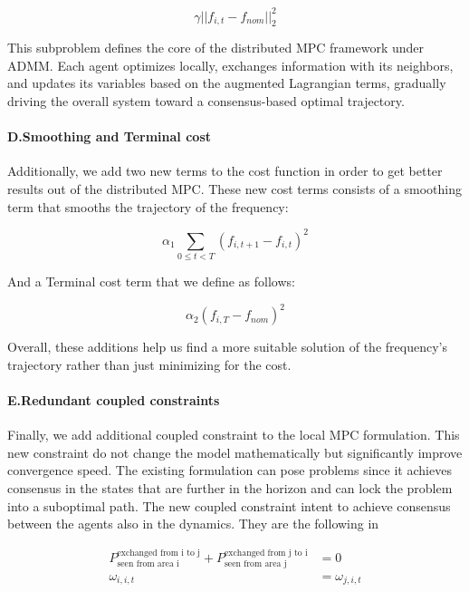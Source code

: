 \documentclass{article}
\begin{document}
\begin{equation}
    \gamma ||f_{i,t} - f_{nom}||_2^2
\end{equation}

This subproblem defines the core of the distributed MPC framework under ADMM. Each agent optimizes locally, exchanges information with its neighbors, and updates its variables based on the augmented Lagrangian terms, gradually driving the overall system toward a consensus-based optimal trajectory.

\paragraph{D.Smoothing and Terminal cost} 

Additionally, we add two new terms to the cost function in order to get better results out of the distributed MPC. These new cost terms consists of a smoothing term that smooths the trajectory of the frequency:

\begin{equation}
    \alpha_1 \sum_{0 \leq t < T}(f_{i,t+1} - f_{i,t})^2 
\end{equation}

And a Terminal cost term that we define as follows:

\begin{equation}
    \alpha_2 (f_{i,T} - f_{nom})^2 
\end{equation}

Overall, these additions help us find a more suitable solution of the frequency's trajectory rather than just minimizing for the cost.

\paragraph{E.Redundant coupled constraints} 

Finally, we add additional coupled constraint to the local MPC formulation. This new constraint do not change the model mathematically but significantly improve convergence speed. The existing formulation can pose problems since it achieves consensus in the states that are further in the horizon and can lock the problem into a suboptimal path. The new coupled constraint intent to achieve consensus between the agents also in the dynamics. They are the following in 

\begin{align}
    P_{\text{seen from area i}}^{\text{exchanged from i to j}} + P_{\text{seen from area j}}^{\text{exchanged from j to i}} &= 0 \\
    \omega_{i,i,t} &= \omega_{j,i,t}
\end{align}
\end{document}
